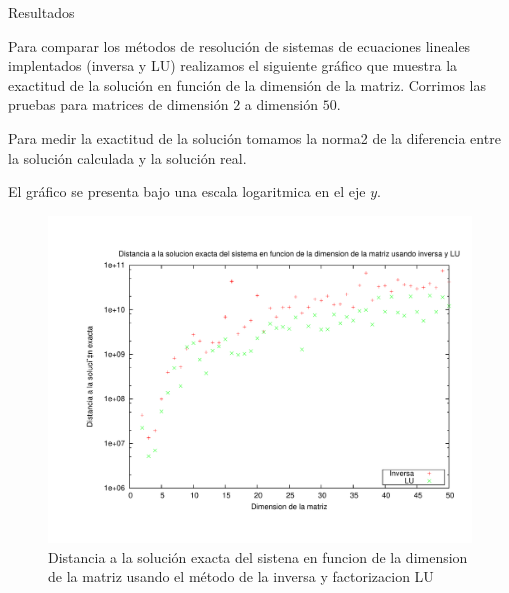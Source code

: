 \begin{section}{Resultados}
	\VSP
	
	Para comparar los métodos de resolución de sistemas de ecuaciones lineales implentados (inversa y LU) realizamos el siguiente gráfico que muestra la exactitud de la solución en función de la dimensión de la matriz. Corrimos las pruebas para matrices de dimensión $2$ a dimensión $50$.
	
	Para medir la exactitud de la solución tomamos la norma2 de la diferencia entre la solución calculada y la solución real.
	
	El gráfico se presenta bajo una escala logaritmica en el eje $y$.
	
	\begin{figure}[H]
	  \centering
		\includegraphics[width=14cm]{graficos/inv_vs_lu.pdf}
	  \caption{Distancia a la solución exacta del sistena en funcion de la dimension de la matriz usando el método de la inversa y factorizacion LU}
	  \label{fig:inv_vs_lu}
	\end{figure}
\end{section}
